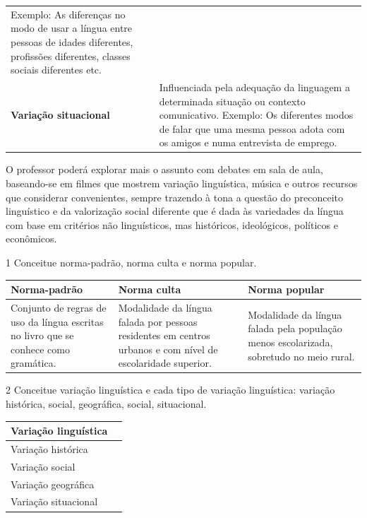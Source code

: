 \begin{longtable}[]{@{}ll@{}}
\begin{minipage}[t]{0.46\columnwidth}
Exemplo: As diferenças no modo de usar a língua entre pessoas de idades
diferentes, profissões diferentes, classes sociais diferentes etc.\strut
\end{minipage}\tabularnewline
\begin{minipage}[t]{0.46\columnwidth}\raggedright
\textbf{Variação situacional}\strut
\end{minipage} & \begin{minipage}[t]{0.46\columnwidth}\raggedright
Influenciada pela adequação da linguagem a determinada situação ou
contexto comunicativo. Exemplo: Os diferentes modos de falar que uma
mesma pessoa adota com os amigos e numa entrevista de emprego.\strut
\end{minipage}\tabularnewline
\bottomrule
\end{longtable}

O professor poderá explorar mais o assunto com debates em sala de aula,
baseando-se em filmes que mostrem variação linguística, música e outros
recursos que considerar convenientes, sempre trazendo à tona a questão
do preconceito linguístico e da valorização social diferente que é dada
às variedades da língua com base em critérios não linguísticos, mas
históricos, ideológicos, políticos e econômicos.


\num{1} Conceitue norma-padrão, norma culta e norma popular.

\begin{longtable}[]{@{}lll@{}}
\toprule
Norma-padrão & Norma culta & Norma popular\tabularnewline
\midrule
\endhead
Conjunto de regras de uso da língua escritas no livro que se conhece
como gramática. & Modalidade da língua falada por pessoas residentes em
centros urbanos e com nível de escolaridade superior. & Modalidade da
língua falada pela população menos escolarizada, sobretudo no meio
rural.\tabularnewline
\bottomrule
\end{longtable}

\num{2} Conceitue variação linguística e cada tipo de variação
linguística: variação histórica, social, geográfica, social,
situacional.

\begin{longtable}[]{@{}ll@{}}
\toprule
Variação linguística &\tabularnewline
\midrule
\endhead
Variação histórica &\tabularnewline
Variação social &\tabularnewline
Variação geográfica &\tabularnewline
Variação situacional &\tabularnewline
\bottomrule
\end{longtable}

